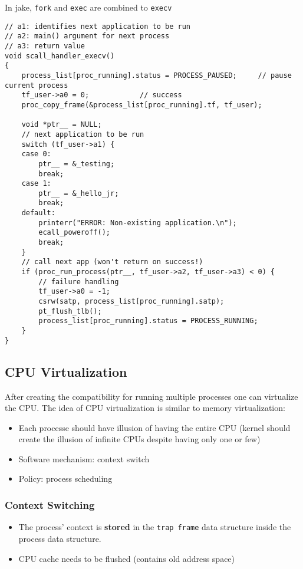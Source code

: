 In jake, \texttt{fork} and \texttt{exec} are combined to \texttt{execv}
\begin{lstlisting}[style=bright_C++]
// a1: identifies next application to be run
// a2: main() argument for next process
// a3: return value
void scall_handler_execv()
{
    process_list[proc_running].status = PROCESS_PAUSED;     // pause current process
    tf_user->a0 = 0;            // success                                    
    proc_copy_frame(&process_list[proc_running].tf, tf_user);

    void *ptr__ = NULL;
    // next application to be run
    switch (tf_user->a1) {
    case 0:
        ptr__ = &_testing;
        break;
    case 1:
        ptr__ = &_hello_jr;
        break;
    default:
        printerr("ERROR: Non-existing application.\n");
        ecall_poweroff();
        break;
    }
    // call next app (won't return on success!)
    if (proc_run_process(ptr__, tf_user->a2, tf_user->a3) < 0) {
        // failure handling
        tf_user->a0 = -1;
        csrw(satp, process_list[proc_running].satp);
        pt_flush_tlb();
        process_list[proc_running].status = PROCESS_RUNNING;
    }
}
\end{lstlisting}

\subsection{CPU Virtualization}
After creating the compatibility for running multiple processes one can virtualize the CPU. The idea of CPU virtualization is similar to memory virtualization:
\begin{itemize}
    \item Each processe should have illusion of having the entire CPU (kernel should create the illusion of infinite CPUs despite having only one or few)
    \item Software mechanism: context switch
    \item Policy: process scheduling
\end{itemize}
\subsubsection{Context Switching}
\begin{itemize}
    \item The process' context is \textbf{stored} in the \texttt{trap frame} data structure inside the process data structure.
    \item CPU cache needs to be flushed (contains old address space)
\end{itemize}

